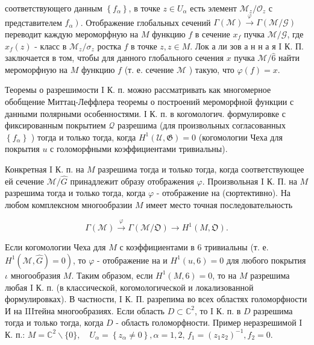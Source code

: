 \documentclass[10pt]{article}
\begin{document}
соответствующего данным $\left\{f_{\alpha}\right\}$, в точке $z \in U_{\alpha}$ есть элемент $\mathscr{M}_{z} / \mathscr{O}_{z}$ с представителем $\left.f_{\alpha}\right)$. Отображение глобальных сечений $\Gamma(\mathscr{M}) \stackrel{\varphi}{\rightarrow} \Gamma(\mathscr{M} / \mathscr{G})$ переводит каждую мероморфную на $M$ функцию $f$ в сечение $x_{f}$ пучка $\mathscr{M} / \mathcal{G}$, где $x_{f}(z)$ - класс в $\mathscr{M}_{z} / \sigma_{z}$ ростка $f$ в точке $z, z \in M$. Лок а ли зов а н н а я I К. П. заключается в том, чтобы для данного глобального сечения $x$ пучка $\mathscr{M} / \widehat{6}$ найти мероморфную на $M$ функцию $f$ (т. е. сечение $\mathscr{M}$ ) такую, что $\varphi(f)=x$.



Теоремы о разрешимости I К. п. можно рассматривать как многомерное обобщение Миттац-Леффлера теоремы о построений мероморфной функции с данными полярными особенностями. І К. п. в когомологич. формулировке с фиксированным покрытием $\mathcal{Q}$ разрешима (для произвольных согласованных $\left\{f_{\alpha}\right\}$ ) тогда и только тогда, когда $H^{1}(\mathcal{U}, \mathfrak{G})=0$ (когомологии Чеха для покрытия $u$ с голоморфными коэффициентами тривиальны).



Конкретная I К. п. на $M$ разрешима тогда и только тогда, когда соответствующее ей сечение $\mathscr{M} / \widehat{G}$ принадлежит образу отображения $\varphi$. Произвольная I К. П. на $M$ разрешима тогда и только тогда, когда $\varphi$ - отображение на (сюртективно). На любом комплексном многообразии $M$ имеет место точная последовательность



\[

\Gamma(\mathcal{M}) \stackrel{\varphi}{\longrightarrow} \Gamma(\mathscr{M} / \mathfrak{O}) \longrightarrow H^{1}(M, \mathfrak{O}) .

\]



Если когомологии Чеха для $M$ с коэффициентами в 6 тривиальны (т. е. $\left.H^{1}(\mathscr{M}, \widehat{G})=0\right)$, то $\varphi$ - отображение на и $H^{1}(u, 6)=0$ для любого покрытия $\iota$ многообразия $M$. Таким образом, если $H^{1}(M, 6)=0$, то на $M$ разрешима любая I К. п. (в классической, когомологической и локализованной формулировках). В частности, I К. П. разрепима во всех областях голоморфности И на IIIтейна многообразиях. Если область $D \subset \mathbb{C}^{2}$, то I К. п. в $D$ разрешима тогда и только тогда, когда $D$ - область голоморфности. Пример неразрешимой I К. п.: $M=\mathbb{C}^{2} \backslash\{0\}, \quad U_{\alpha}=\left\{z_{\alpha} \neq 0\right\}, \alpha=1,2$, $f_{1}=\left(z_{1} z_{2}\right)^{-1}, f_{2}=0$.
\end{document}
